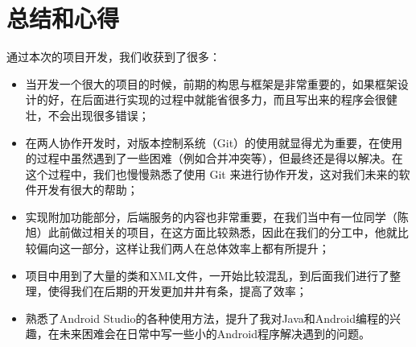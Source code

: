 \section{总结和心得}

通过本次的项目开发，我们收获到了很多：

\begin{itemize}
    \item 当开发一个很大的项目的时候，前期的构思与框架是非常重要的，如果框架设计的好，在后面进行实现的过程中就能省很多力，而且写出来的程序会很健壮，不会出现很多错误；
    \item 在两人协作开发时，对版本控制系统（Git）的使用就显得尤为重要，在使用的过程中虽然遇到了一些困难（例如合并冲突等），但最终还是得以解决。在这个过程中，我们也慢慢熟悉了使用 Git 来进行协作开发，这对我们未来的软件开发有很大的帮助；
    \item 实现附加功能部分，后端服务的内容也非常重要，在我们当中有一位同学（陈旭）此前做过相关的项目，在这方面比较熟悉，因此在我们的分工中，他就比较偏向这一部分，这样让我们两人在总体效率上都有所提升；
    \item 项目中用到了大量的类和XML文件，一开始比较混乱，到后面我们进行了整理，使得我们在后期的开发更加井井有条，提高了效率；
    \item 熟悉了Android Studio的各种使用方法，提升了我对Java和Android编程的兴趣，在未来困难会在日常中写一些小的Android程序解决遇到的问题。
\end{itemize}


